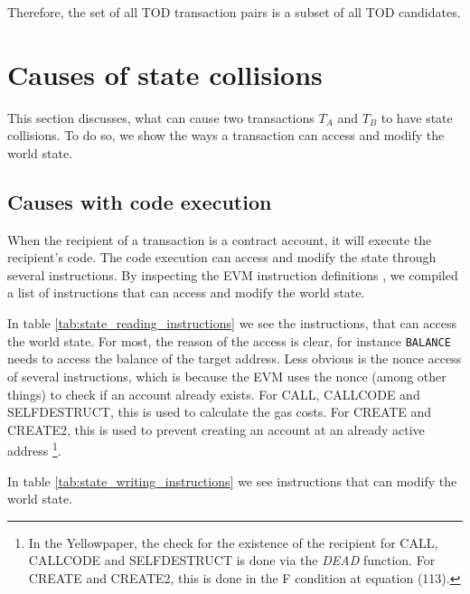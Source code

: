 \documentclass[draft,final]{vutinfth} %
\begin{document}
Therefore, the set of all TOD transaction pairs is a subset of all TOD candidates.

\section{Causes of state collisions}

This section discusses, what can cause two transactions $T_A$ and $T_B$ to have state collisions. To do so, we show the ways a transaction can access and modify the world state.

\subsection{Causes with code execution}

When the recipient of a transaction is a contract account, it will execute the recipient's code. The code execution can access and modify the state through several instructions. By inspecting the EVM instruction definitions \cite[p.30-38]{wood_ethereum_2024}\cite{smlxl_evm_2024}, we compiled a list of instructions that can access and modify the world state.

In table \ref{tab:state_reading_instructions} we see the instructions, that can access the world state. For most, the reason of the access is clear, for instance \verb|BALANCE| needs to access the balance of the target address. Less obvious is the nonce access of several instructions, which is because the EVM uses the nonce (among other things) to check if an account already exists\cite[p.4]{wood_ethereum_2024}. For CALL, CALLCODE and SELFDESTRUCT, this is used to calculate the gas costs. \cite[p.37-38]{wood_ethereum_2024} For CREATE and CREATE2, this is used to prevent creating an account at an already active address \cite[p.11]{wood_ethereum_2024}\footnote{In the Yellowpaper, the check for the existence of the recipient for CALL, CALLCODE and SELFDESTRUCT is done via the \emph{DEAD} function. For CREATE and CREATE2, this is done in the F condition at equation (113).}.

In table \ref{tab:state_writing_instructions} we see instructions that can modify the world state.
\end{document}
